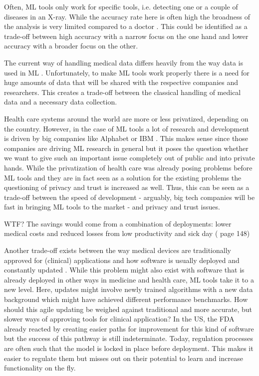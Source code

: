 Often, ML tools only work for specific tools, i.e. detecting one or a couple of diseases in an X-ray. While the accuracy rate here is often high the broadness of the analysis is very limited compared to a doctor \cite{topol2019high}. This could be identified as a trade-off between high accuracy with a narrow focus on the one hand and lower accuracy with a broader focus on the other.


The current way of handling medical data differs heavily from the way data is used in ML \cite{he2019practical}. Unfortunately, to make ML tools work properly there is a need for huge amounts of data that will be shared with the respective companies and researchers. This creates a trade-off between the classical handling of medical data and a necessary data collection.


Health care systems around the world are more or less privatized, depending on the country. However, in the case of ML tools a lot of research and development is driven by big companies like Alphabet or IBM \cite{Morley2020}. This makes sense since those companies are driving ML research in general but it poses the question whether we want to give such an important issue completely out of public and into private hands. While the privatization of health care was already posing problems before ML tools and they are in fact seen as a solution for the existing problems \cite{Morley2020, topol2019high} the questioning of privacy and trust is increased as well. Thus, this can be seen as a trade-off between the speed of development - arguably, big tech companies will be fast in bringing ML tools to the market - and privacy and trust issues.



WTF?  The savings would come from a combination of deployments: lower medical costs and reduced losses from low productivity and sick day (\cite{horgan2019artificial} page 148)


Another trade-off exists between the way medical devices are traditionally approved for (clinical) applications and how software is usually deployed and constantly updated \cite{he2019practical}. While this problem might also exist with software that is already deployed in other ways in medicine and health care, ML tools take it to a new level. Here, updates might involve newly trained algorithms with a new data background which might have achieved different performance benchmarks. How should this agile updating be weighed against traditional and more accurate, but slower ways of approving tools for clinical application? In the US, the FDA already reacted by creating easier paths for improvement for this kind of software but the success of this pathway is still indeterminate.
Today, regulation processes are often such that the model is locked in place before deployment. This makes it easier to regulate them but misses out on their potential to learn and increase functionality on the fly. 

